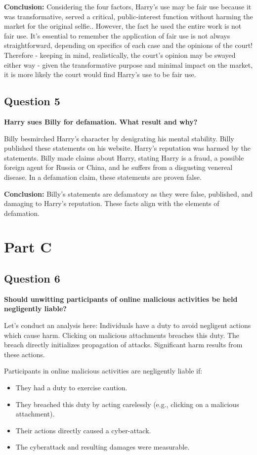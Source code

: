 \documentclass[12pt]{article}
\begin{document}
\textbf{Conclusion:} Considering the four factors, Harry’s use may be fair use because it was transformative, served a critical, public-interest function without harming the market for the original selfie.. However, the fact he used the entire work is not fair use. It’s essential to remember the application of fair use is not always straightforward,  depending on specifics of each case and the opinions of the court! Therefore - keeping in mind, realistically, the court's opinion may be swayed either way - given the transformative purpose and minimal impact on the market, it is more likely the court would find Harry’s use to be fair use. 

\subsection*{Question 5}
\textbf{Harry sues Billy for defamation. What result and why?}


Billy besmirched Harry's character by denigrating his mental stability.
Billy published these statements on his website.
Harry's reputation was harmed by the statements.
Billy made claims about Harry, stating Harry is a fraud, a possible foreign agent for Russia or China, and he suffers from a disgusting venereal disease. In a defamation claim, these statements are proven false.

\textbf{Conclusion:} Billy's statements are defamatory as they were false, published, and damaging to Harry's reputation. These facts align with the elements of defamation.

\section*{Part C}

\subsection*{Question 6}
\textbf{Should unwitting participants of online malicious activities be held negligently liable?}

Let's conduct an analysis here: 
Individuals have a duty to avoid negligent actions which cause harm.
Clicking on malicious attachments breaches this duty.
The breach directly initializes propagation of attacks.
Significant harm results from these actions.

Participants in online malicious activities are negligently liable if:
\begin{itemize}
    \item They had a duty to exercise caution.
    \item They breached this duty by acting carelessly (e.g., clicking on a malicious attachment).
    \item Their actions directly caused a cyber-attack.
    \item The cyberattack and resulting damages were measurable.
\end{itemize}
\end{document}
